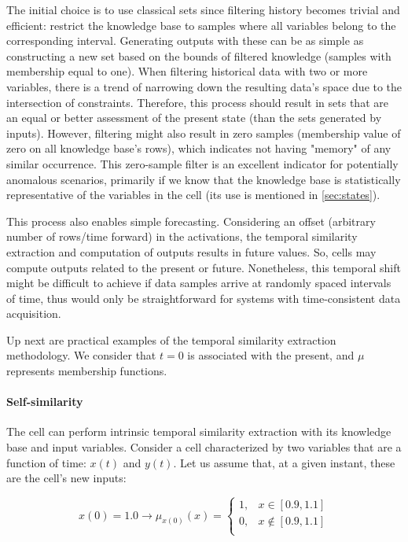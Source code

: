 The initial choice is to use classical sets since filtering history becomes trivial and efficient: restrict the knowledge base to samples where all variables belong to the corresponding interval. Generating outputs with these can be as simple as constructing a new set based on the bounds of filtered knowledge (samples with membership equal to one). When filtering historical data with two or more variables, there is a trend of narrowing down the resulting data's space due to the intersection of constraints. Therefore, this process should result in sets that are an equal or better assessment of the present state (than the sets generated by inputs). However, filtering might also result in zero samples (membership value of zero on all knowledge base's rows), which indicates not having "memory" of any similar occurrence. This zero-sample filter is an excellent indicator for potentially anomalous scenarios, primarily if we know that the knowledge base is statistically representative of the variables in the cell (its use is mentioned in \ref{sec:states}).

This process also enables simple forecasting. Considering an offset (arbitrary number of rows/time forward) in the activations, the temporal similarity extraction and computation of outputs results in future values. So, cells may compute outputs related to the present or future. Nonetheless, this temporal shift might be difficult to achieve if data samples arrive at randomly spaced intervals of time, thus would only be straightforward for systems with time-consistent data acquisition.

Up next are practical examples of the temporal similarity extraction methodology. We consider that $t=0$ is associated with the present, and $\mu$ represents membership functions.

\paragraph{Self-similarity}

The cell can perform intrinsic temporal similarity extraction with its knowledge base and input variables. Consider a cell characterized by two variables that are a function of time: $x(t)$ and $y(t)$.
Let us assume that, at a given instant, these are the cell's new inputs:

\begin{equation}
    x(0) = 1.0 \rightarrow \mu_{x(0)}(x) =
    \begin{cases}
        1, & x \in [0.9, 1.1]    \\
        0, & x \notin [0.9, 1.1] \\
    \end{cases}
\end{equation}

